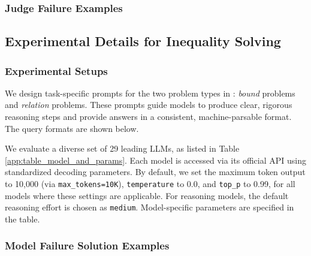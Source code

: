 \subsubsection{Judge Failure Examples}
\label{app:judge_failure_examples}









\clearpage
\subsection{Experimental Details for Inequality Solving}
\label{app:exp_details}

\subsubsection{Experimental Setups}
\label{app:exp_setups}

We design task-specific prompts for the two problem types in \dataset: \textit{bound} problems and \textit{relation} problems. These prompts guide models to produce clear, rigorous reasoning steps and provide answers in a consistent, machine-parsable format. The query formats are shown below.





We evaluate a diverse set of 29 leading LLMs, as listed in Table \ref{app:table_model_and_params}. Each model is accessed via its official API using standardized decoding parameters. By default, we set the maximum token output to 10,000 (via \texttt{max\_tokens=10K}), \texttt{temperature} to 0.0, and \texttt{top\_p} to 0.99, for all models where these settings are applicable. For reasoning models, the default reasoning effort is chosen as \texttt{medium}. Model-specific parameters are specified in the table.




\clearpage
\subsubsection{Model Failure Solution Examples}
\label{app:incorrect_solution_examples}


